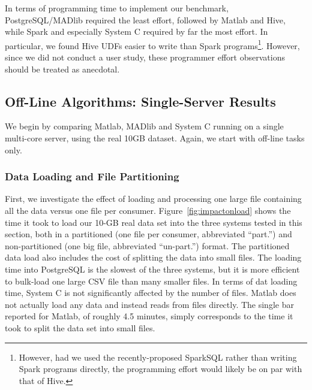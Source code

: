 \documentclass[prodmode,acmtods]{acmsmall}
\begin{document}

In terms of programming time to implement our benchmark, PostgreSQL/MADlib required the least effort, followed by Matlab and Hive, while Spark and especially System C required by far the most effort.  In particular, we found Hive UDFs easier to write than Spark programs\footnote{However, had we used the recently-proposed SparkSQL rather than writing Spark programs directly, the programming effort would likely be on par with that of Hive.}.  However, since we did not conduct a user study, these programmer effort observations should be treated as anecdotal.


\subsection{Off-Line Algorithms: Single-Server Results}  \label{sec:results}

We begin by comparing Matlab, MADlib and System C running on a single multi-core server, using the real 10GB dataset.  Again, we start with off-line tasks only.

\subsubsection{Data Loading and File Partitioning}
\label{exp:loading}

First, we investigate the effect of loading and processing one large file containing all the data versus one file per consumer.  Figure~\ref{fig:impactonload} shows the time it took to load our 10-GB real data set into the three systems tested in this section, both in a partitioned (one file per consumer, abbreviated ``part.'') and non-partitioned (one big file, abbreviated ``un-part.'') format.  The partitioned data load also includes the cost of splitting the data into small files.  The loading time into PostgreSQL is the slowest of the three systems, but it is more efficient to bulk-load one large CSV file than many smaller files.  In terms of dat loading time, System C is not significantly affected by the number of files.  Matlab does not actually load any data and instead reads from files directly.  The single bar reported for Matlab, of roughly 4.5 minutes, simply corresponds to the time it took to split the data set into small files.
\end{document}

